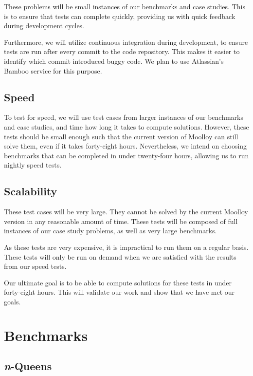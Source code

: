 \documentclass[11pt]{article}
\begin{document}
These problems will be small instances of our benchmarks and case
studies. This is to ensure that tests can complete quickly, providing
us with quick feedback during development cycles.

Furthermore, we will utilize continuous integration during development,
to ensure tests are run after every commit to the code repository. This
makes it easier to identify which commit introduced buggy code. We plan
to use Atlassian's Bamboo service for this purpose.

\subsection{Speed}

To test for speed, we will use test cases from larger instances of our
benchmarks and case studies, and time how long it takes to compute
solutions. However, these tests should be small enough such that the
current version of Moolloy can still solve them, even if it takes
forty-eight hours. Nevertheless, we intend on choosing benchmarks that
can be completed in under twenty-four hours, allowing us to run nightly
speed tests.

\subsection{Scalability}

These test cases will be very large. They cannot be solved by the
current Moolloy version in any reasonable amount of time. These tests
will be composed of full instances of our case study problems, as well
as very large benchmarks.

As these tests are very expensive, it is impractical to run them on a
regular basis. These tests will only be run on demand when we are
satisfied with the results from our speed tests.

Our ultimate goal is to be able to compute solutions for these tests in
under forty-eight hours. This will validate our work and show that we
have met our goals.

\section{Benchmarks}

\subsection{\textit{n}-Queens}
\end{document}
